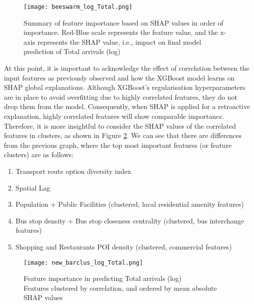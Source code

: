 \begin{figure}[!hbt]
    \centering
    \texttt{[image: beeswarm\_log\_Total.png]}
    \captionsetup{justification=centering}
    \caption{Summary of feature importance based on SHAP values in order of importance. Red-Blue scale represents the feature value, and the x-axis represents the SHAP value, i.e., impact on final model prediction of Total arrivals (log)}
    \label{fig:beeswarmtotal}
\end{figure}

At this point, it is important to acknowledge the effect of correlation between the input features as previously observed and how the XGBoost model learns on SHAP global explanations. Although XGBoost's regularisation hyperparameters are in place to avoid overfitting due to highly correlated features, they do not drop them from the model. Consequently, when SHAP is applied for a retroactive explanation, highly correlated features will show comparable importance. Therefore, it is more insightful to consider the SHAP values of the correlated features in clusters, as shown in Figure \ref{fig:barclustertotal}. We can see that there are differences from the previous graph, where the top most important features (or feature clusters) are as follows:

\begin{enumerate}
    \setlength\itemsep{-0.3em}
    \item Transport route option diversity index
    \item Spatial Lag
    \item Population + Public Facilities (clustered, local residential amenity features)
    \item Bus stop density + Bus stop closeness centrality (clustered, bus interchange features)
    \item Shopping and Restaurants POI density (clustered, commercial features)
\end{enumerate}

\begin{figure}[ht]
    \centering
    \texttt{[image: new\_barclus\_log\_Total.png]}
    \captionsetup{justification=centering}
    \caption{Feature importance in predicting Total arrivals (log)\\Features clustered by correlation, and ordered by mean absolute SHAP values}
    \label{fig:barclustertotal}
\end{figure}

